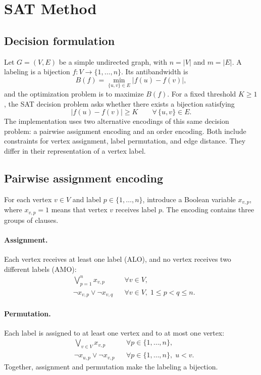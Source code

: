 \section{SAT Method}
\label{sec:sat-method}

\subsection{Decision formulation}
Let $G=(V,E)$ be a simple undirected graph, with $n=|V|$ and $m=|E|$. A
labeling is a bijection $f:V\rightarrow\{1,\ldots,n\}$. Its antibandwidth is
\begin{equation}
  B(f)=\min_{\{u,v\}\in E}|f(u)-f(v)|,
\end{equation}
and the optimization problem is to maximize $B(f)$. For a fixed threshold
$K\geq 1$, the SAT decision problem asks whether there exists a bijection
satisfying
\begin{equation}
  |f(u)-f(v)|\geq K
  \qquad \forall\,\{u,v\}\in E.
  \label{eq:sat-decision}
\end{equation}
The implementation uses two alternative encodings of this same decision
problem: a pairwise assignment encoding and an order encoding. Both include
constraints for vertex assignment, label permutation, and edge distance.
They differ in their representation of a vertex label.

\subsection{Pairwise assignment encoding}
For each vertex $v\in V$ and label $p\in\{1,\ldots,n\}$, introduce a Boolean
variable $x_{v,p}$, where $x_{v,p}=1$ means that vertex $v$ receives label $p$.
The encoding contains three groups of clauses.

\paragraph{Assignment.}
Each vertex receives at least one label (ALO), and no vertex receives two
different labels (AMO):
\begin{align}
  &\bigvee_{p=1}^{n}x_{v,p}
      &&\forall v\in V,\\
  &\neg x_{v,p}\vee\neg x_{v,q}
      &&\forall v\in V,\;1\leq p<q\leq n.
\end{align}

\paragraph{Permutation.}
Each label is assigned to at least one vertex and to at most one vertex:
\begin{align}
  &\bigvee_{v\in V}x_{v,p}
      &&\forall p\in\{1,\ldots,n\},\\
  &\neg x_{u,p}\vee\neg x_{v,p}
      &&\forall p\in\{1,\ldots,n\},\;u<v.
\end{align}
Together, assignment and permutation make the labeling a bijection.


